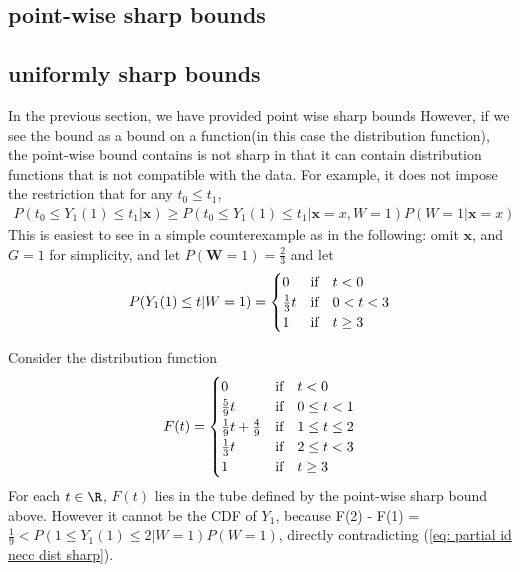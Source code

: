 \documentclass[uplatex,dvipdfmx]{jsarticle}
\begin{document}
\subsection{point-wise sharp bounds}

\subsection{uniformly sharp bounds}
In the previous section, we have provided point wise sharp bounds
However, if we see the bound as a bound on a function(in this case the distribution function), the point-wise bound contains is not sharp in that it can contain distribution functions that is not compatible with the data. 
For example, it does not impose the restriction that for any $ t_0 \le t_1$, 
\begin{align}
\label{eq: partial id necc dist sharp}
    P( t_0 \leq Y_1(1) \leq t_1 | \mathbf{x} ) \geq P ( t_0 \leq Y_1(1) \leq t_1 | \mathbf{x} = x, W = 1) P ( W =1 | \mathbf{x} = x)
\end{align}
This is easiest to see in a simple counterexample as in the following: 
omit $\mathbf{x}$, and $G=1$ for simplicity, and let $P ( \mathbf{W} = 1 ) = \frac{2}{3} $ and let 
\begin{align}
    P (Y_1(1) \leq t | W=1)=
    \begin{cases}
    0&\text{if}\quad t<0\\
    \frac{1}{3}t&\text{if}\quad 0< t< 3\\
    1 & \text{if}\quad t \geq 3
    \end{cases}
\end{align}


Consider the distribution function 
\begin{align}
    F(t) = \begin{cases}
        0&\text{if}\quad t < 0\\
        \frac{5}{9}t & \text{if}\quad 0 \leq t < 1 \\
        \frac{1}{9}t + \frac{4}{9} & \text{if}\quad  1 \leq t \leq 2\\
        \frac{1}{3}t & \text{if}\quad  2\leq t < 3\\
        1 & \text{if}\quad t \geq 3
    \end{cases}
\end{align}
For each $t \in\R$, $F(t)$ lies in the tube defined by the point-wise sharp bound above. However it cannot be the CDF of $ Y_1$, because F(2) - F(1) = $ \frac{1}{9}< P (1 \leq Y_1(1) \leq 2 | W=1) P( W=1)  $, directly contradicting (\ref{eq: partial id necc dist sharp}).
\end{document}
